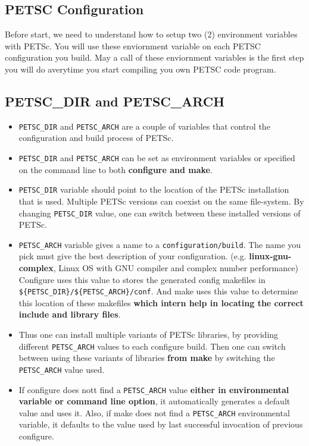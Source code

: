 \documentclass{article}
\begin{document}
\subsection{PETSC Configuration}
Before start, we need to understand how to setup two (2) environment variables with PETSc. You will use these enviornment variable on each
PETSC configuration you build. May a call of these enviornment variables is the first step you will do averytime you start compiling you own PETSC code program.

\subsection{PETSC\_DIR and PETSC\_ARCH} 
\begin{itemize}
\item \verb+PETSC_DIR+ and \verb+PETSC_ARCH+ are a couple of variables that control the configuration and build process of PETSc.
\item \verb+PETSC_DIR+ and \verb+PETSC_ARCH+ can be set as environment variables or specified on the command line to both \textbf{configure and make}.
\item \verb+PETSC_DIR+ variable should point to the location of the PETSc installation that is used. Multiple PETSc versions can coexist on
the same file-system. By changing \verb+PETSC_DIR+ value, one can switch between these installed versions of PETSc.
\item \verb+PETSC_ARCH+ variable gives a name to a \verb+configuration/build+. The name you pick must give the best description of your configuration.
(e.g. \textbf{linux-gnu-complex}, Linux OS with GNU compiler and complex number performance)
Configure uses this value to stores the generated config makefiles in \verb+${PETSC_DIR}/${PETSC_ARCH}/conf+. And make uses this value to determine this location of these makefiles 
\textbf{which intern help in locating the correct include and library files}.
\item Thus one can install multiple variants of PETSc libraries,  by providing different \verb+PETSC_ARCH+ values to each configure build.
Then one can switch between using these variants of libraries \textbf{from make} by switching the \verb+PETSC_ARCH+ value used.
\item If configure does nott find a \verb+PETSC_ARCH+ value \textbf{either in environmental variable or command line option}, it automatically
generates a default value and uses it. Also, if make does not find a \verb+PETSC_ARCH+ environmental variable, it defaults to the value
used by last successful invocation of previous configure. 
\end{itemize}
\end{document}
